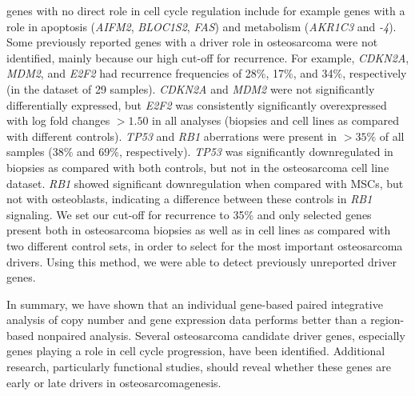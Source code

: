 genes with no direct role in cell cycle regulation
include for example genes with a role in apoptosis
({\it AIFM2}, {\it BLOC1S2}, {\it FAS}) and metabolism
({\it AKR1C3} and {\it -4}). Some previously reported
genes with a driver role in osteosarcoma were not
identified, mainly because our high cut-off for
recurrence. For example, {\it CDKN2A}, {\it MDM2}, and
{\it E2F2} had recurrence frequencies of 28\%, 17\%,
and 34\%, respectively (in the dataset of 29 samples).
{\it CDKN2A} and {\it MDM2} were not significantly
differentially expressed, but {\it E2F2} was consistently
significantly overexpressed with log fold
changes $>1.50$ in all analyses (biopsies and cell
lines as compared with different controls). {\it TP53}
and {\it RB1} aberrations were present in $>35\%$ of all
samples (38\% and 69\%, respectively). {\it TP53} was
significantly downregulated in biopsies as compared
with both controls, but not in the osteosarcoma
cell line dataset. {\it RB1} showed significant
downregulation when compared with MSCs, but
not with osteoblasts, indicating a difference
between these controls in {\it RB1} signaling. We set
our cut-off for recurrence to 35\% and only
selected genes present both in osteosarcoma
biopsies as well as in cell lines as compared with
two different control sets, in order to select for
the most important osteosarcoma drivers. Using
this method, we were able to detect previously
unreported driver genes.

In summary, we have shown that an individual
gene\hyp{}based paired integrative analysis of copy
number and gene expression data performs better
than a region\hyp{}based nonpaired analysis. Several
osteosarcoma candidate driver genes, especially
genes playing a role in cell cycle progression,
have been identified. Additional research, particularly
functional studies, should reveal whether
these genes are early or late drivers in
osteosarcomagenesis.


\begin{small}
\begin{singlespace}

\end{singlespace}
\end{small}

%